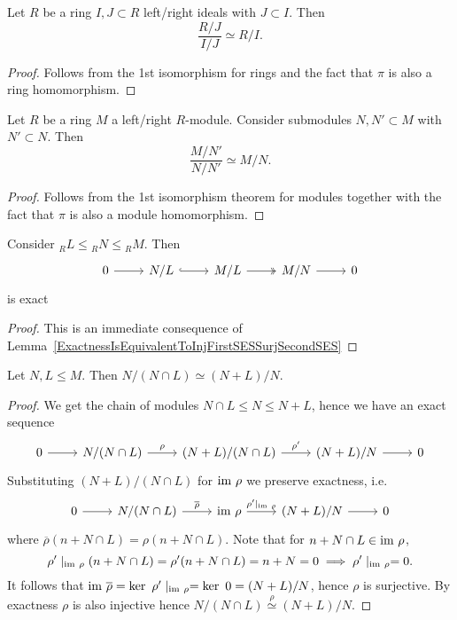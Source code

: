 \begin{corollary}
    Let $R$ be a ring $I,J\subset R$ left/right ideals with $J\subset I$. Then 
    $$\frac{R/J}{I/J}\simeq R/I.$$
\end{corollary}
\begin{proof}
    Follows from the 1st isomorphism for rings and the fact that $\pi$ is also a ring homomorphism. 
\end{proof}
\begin{corollary}
    Let $R$ be a ring $M$ a left/right $R$-module. Consider submodules $N,N'\subset M$ with $N'\subset N$. Then 
    $$\frac{M/N'}{N/N'}\simeq M/N.$$
\end{corollary}
\begin{proof}
    Follows from the 1st isomorphism theorem for modules together with the fact that $\pi$ is also a module homomorphism. 
\end{proof}
\begin{lemma}\label{NoetherSecondIsoForModules}
        Consider $_RL\leq {_RN} \leq {_RM}$. Then 
        $$\begin{tikzcd}
            0 \arrow[r] & N/L \arrow[r,hookrightarrow] & M/L \arrow[r, twoheadrightarrow] &M/N \arrow[r] &0
        \end{tikzcd}$$
        is exact
\end{lemma}
\begin{proof}
    This is an immediate consequence of Lemma~\ref{ExactnessIsEquivalentToInjFirstSESSurjSecondSES}
\end{proof}
\begin{theorem}\label{FirstNoetherIsoTheorem}
    Let $N,L\leq M$. Then $N/(N\cap L)\simeq (N+L)/N$.
\end{theorem}
\begin{proof}
    We get the chain of modules $N\cap L \leq N \leq N+L$, hence we have an exact sequence 
    $$\begin{tikzcd}
        0\arrow[r] & N/(N\cap L) \arrow[r,"\rho"] & (N+L)/(N\cap L) \arrow{r}{\rho'} & (N+L)/N \arrow[r] & 0
    \end{tikzcd}$$
    Substituting $(N+L)/(N\cap L)$ for $\mathrm{im} \ \rho$ we preserve exactness, i.e.
    $$\begin{tikzcd}
        0\arrow[r] & N/(N\cap L) \arrow[r,"\overline{\rho}"] & \im\ \rho \arrow{r}{\rho'\mid_{\im\ \rho}} & (N+L)/N \arrow[r] & 0
    \end{tikzcd}$$
    where $\overline{\rho}(n+N\cap L)= \rho(n+N\cap L).$ Note that for $n+ N\cap L \in \im\ \rho$, 
    $$\rho'\mid_{\mathrm{im}\ \rho}(n+N\cap L) = \rho' (n+N\cap L)= n +N=0 \implies \rho'\mid_{\mathrm{im}\ \rho} = 0.$$
    It follows that $\im \ \overline{\rho} = \ker\ \rho'\mid_{\im\ \rho} = \ker \ 0 = (N+L)/N$, hence $\rho$ is surjective. By exactness $\rho$ is also injective hence $N/(N\cap L) \overset{\rho}{\simeq} (N+L)/N$.
\end{proof}
